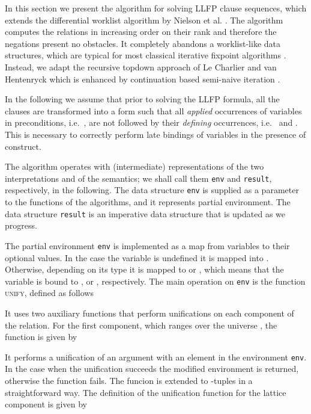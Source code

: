 In this section we present the algorithm for solving LLFP clause
sequences, which extends the differential worklist algorithm by
Nielson et al. \cite{bib:ssforalfp,bib:sssuite}. The algorithm
computes the relations in increasing order on their rank and therefore
the negations present no obstacles. It completely abandons a
worklist-like data structures, which are typical for most classical
iterative fixpoint algorithms
\cite{DBLP:journals/scp/FechtS99}. Instead, we adapt the recursive
topdown approach of Le Charlier and van Hentenryck
\cite{bib:LeCharlier92} which is enhanced by continuation based
semi-naive iteration \cite{bib:Balbin87,bib:FechtSeidl98}.



In the following we assume that prior to solving the LLFP formula, all
the clauses are transformed into a form such that all \textit{applied}
occurrences of variables  in preconditions,
i.e.~, are not followed by their \textit{defining} occurrences,
i.e.~ and . This is necessary to
correctly perform late bindings of variables  in
the presence of  construct.

The algorithm operates with (intermediate) representations of the two
interpretations  and  of the semantics; we
shall call them {\tt env} and {\tt result}, respectively, in the
following. The data structure {\tt env} is supplied as a parameter to
the functions of the algorithms, and it represents partial
environment. The data structure {\tt result} is an imperative data
structure that is updated as we progress.

The partial environment {\tt env} is implemented as a map from
variables to their optional values. In the case the variable is
undefined it is mapped into . Otherwise, depending on its type
it is mapped to  or , which means that the
variable is bound to , or ,
respectively. The main operation on {\tt env} is the function
\textsc{unify}, defined as follows

It uses two auxiliary functions that perform unifications on each
component of the relation. For the first component, which ranges over
the universe , the function is given by

It performs a unification of an argument  with an element  in the environment {\tt env}. In the case when the unification
succeeds the modified environment is returned, otherwise the function
fails. The funcion is extended to -tuples in a straightforward
way. The definition of the unification function for the lattice
component is given by

